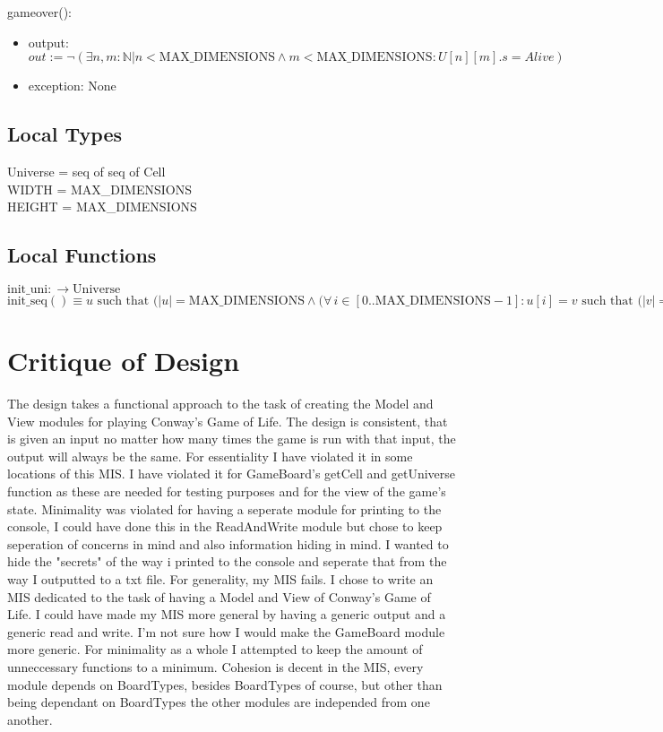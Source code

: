 \documentclass[12pt]{article}
\begin{document}
\noindent gameover():
\begin{itemize}
\item output: $out := \neg(\exists n, m : \mathbb{N} | n < \text{MAX\_DIMENSIONS} \land m < \text{MAX\_DIMENSIONS} : U[n][m].s = Alive)$
\item exception: None
\end{itemize}

\subsection*{Local Types}

Universe = seq of seq of Cell\\
WIDTH = MAX\_DIMENSIONS\\
HEIGHT = MAX\_DIMENSIONS

\subsection*{Local Functions}

$\text{init\_uni}:  \rightarrow \text{Universe}$\\
\noindent $\text{init\_seq}() \equiv u \text{ such that } (|u| = \text{MAX\_DIMENSIONS} \land (\forall\, i
\in [0..\text{MAX\_DIMENSIONS}-1] : u[i] = v \text{ such that } (|v| = \text{MAX\_DIMENSIONS} \land (\forall\, j
\in [0..\text{MAX\_DIMENSIONS}-1]: v[j].s = Dead$

\newpage

\section*{Critique of Design}

The design takes a functional approach to the task of creating the Model and View modules for playing Conway's Game of Life. 
The design is consistent, that is given an input no matter how many times the game is run with that input, the output will always
be the same. For essentiality I have violated it in some locations of this MIS. I have violated it for GameBoard's getCell and getUniverse
function as these are needed for testing purposes and for the view of the game's state. Minimality was violated for having a seperate module 
for printing to the console, I could have done this in the ReadAndWrite module but chose to keep seperation of concerns in mind and also
information hiding in mind. I wanted to hide the "secrets" of the way i printed to the console and seperate that from the way I outputted
to a txt file. For generality, my MIS fails. I chose to write an MIS dedicated to the task of having a Model and View of Conway's Game of Life.
I could have made my MIS more general by having a generic output and a generic read and write. I'm not sure how I would make the GameBoard 
module more generic. For minimality as a whole I attempted to keep the amount of unneccessary functions to a minimum. Cohesion is decent
in the MIS, every module depends on BoardTypes, besides BoardTypes of course, but other than being dependant on BoardTypes the other 
modules are independed from one another. 
\end{document}
